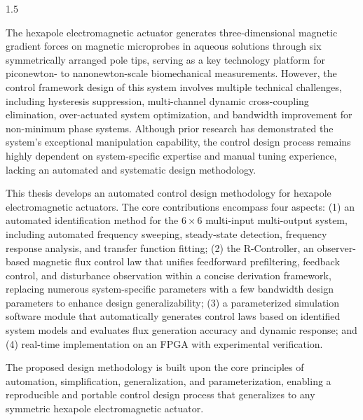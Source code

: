 \begin{abstracten}
\begin{spacing}{1.5}

The hexapole electromagnetic actuator generates three-dimensional magnetic gradient forces on magnetic microprobes in aqueous solutions through six symmetrically arranged pole tips, serving as a key technology platform for piconewton- to nanonewton-scale biomechanical measurements. However, the control framework design of this system involves multiple technical challenges, including hysteresis suppression, multi-channel dynamic cross-coupling elimination, over-actuated system optimization, and bandwidth improvement for non-minimum phase systems. Although prior research has demonstrated the system's exceptional manipulation capability, the control design process remains highly dependent on system-specific expertise and manual tuning experience, lacking an automated and systematic design methodology.

This thesis develops an automated control design methodology for hexapole electromagnetic actuators. The core contributions encompass four aspects: (1) an automated identification method for the $6\times6$ multi-input multi-output system, including automated frequency sweeping, steady-state detection, frequency response analysis, and transfer function fitting; (2) the R-Controller, an observer-based magnetic flux control law that unifies feedforward prefiltering, feedback control, and disturbance observation within a concise derivation framework, replacing numerous system-specific parameters with a few bandwidth design parameters to enhance design generalizability; (3) a parameterized simulation software module that automatically generates control laws based on identified system models and evaluates flux generation accuracy and dynamic response; and (4) real-time implementation on an FPGA with experimental verification.

The proposed design methodology is built upon the core principles of automation, simplification, generalization, and parameterization, enabling a reproducible and portable control design process that generalizes to any symmetric hexapole electromagnetic actuator.


\end{spacing}
\end{abstracten}
